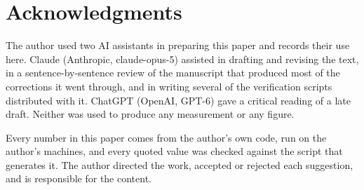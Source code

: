 \documentclass[11pt]{article}
\begin{document}
\section*{Acknowledgments}

The author used two AI assistants in preparing this paper and records
their use here.  Claude (Anthropic, claude-opus-5) assisted in
drafting and revising the text, in a sentence-by-sentence review of the
manuscript that produced most of the corrections it went through, and in
writing several of the verification scripts distributed with it.
ChatGPT (OpenAI, GPT-6) gave a critical reading of a late draft.
Neither was used to produce any measurement or any figure.

Every number in this paper comes from the author's own code, run on the
author's machines, and every quoted value was checked against the script
that generates it.  The author directed the work, accepted or rejected
each suggestion, and is responsible for the content.

\appendix
\end{document}
